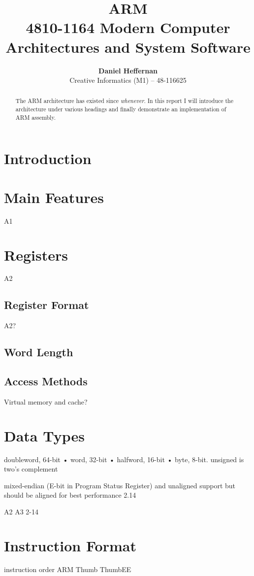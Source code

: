 \documentclass[oneside,a4paper]{article}
\title{ \textbf{ARM} \\ \large{4810-1164 Modern Computer Architectures and System Software}}
\author{ \textbf{Daniel Heffernan} \\ Creative Informatics (M1) -- 48-116625 }
\begin{document}
\ifpdf
{}
\else
{}
\fi

\maketitle


\begin{abstract}
    The ARM architecture has existed since \emph{whenever}. In this report I will introduce the architecture under various headings and finally demonstrate an implementation of ARM assembly.
\end{abstract}

\section{Introduction}
\section{Main Features}
A1
\section{Registers}
A2
\subsection{Register Format}
A2?
\subsection{Word Length}
\subsection{Access Methods}
Virtual memory and cache?
\section{Data Types}
doubleword, 64-bit
• word, 32-bit
• halfword, 16-bit
• byte, 8-bit.
unsigned is two's complement

mixed-endian (E-bit in Program Status Register) and unaligned support but should be aligned for best performance
2.14


A2
A3
2-14
\section{Instruction Format}
instruction order
ARM
Thumb
ThumbEE
\end{document}
